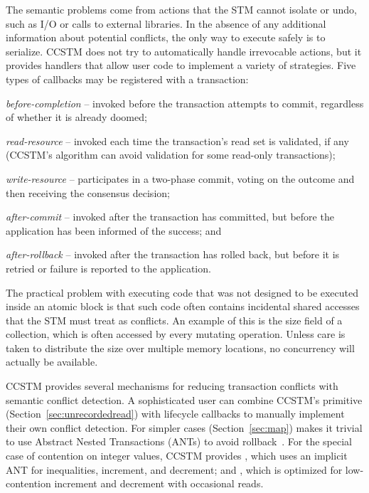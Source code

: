 The semantic problems come
from actions that the STM cannot isolate or undo, such as I/O or calls to
external libraries.  In the absence of any additional information about
potential conflicts, the only way to execute safely is to serialize.
CCSTM does not try to automatically handle irrevocable actions, but
it provides handlers that allow user code to implement a variety of
strategies.  Five types of callbacks may be registered with a transaction:
\begin{packed_itemize}

\item{\it before-completion} -- invoked before the transaction attempts to
commit, regardless of whether it is already doomed;

\item{\it read-resource} -- invoked each time the transaction's read
set is validated, if any (CCSTM's algorithm can avoid validation for
some read-only transactions);

\item{\it write-resource} -- participates in a two-phase commit, voting on the
outcome and then receiving the consensus decision;

\item{\it after-commit} -- invoked after the transaction has committed, but
before the application has been informed of the success; and

\item{\it after-rollback} -- invoked after the transaction has rolled back, but
before it is retried or failure is reported to the application.

\end{packed_itemize}

The practical problem with executing code that was not designed to
be executed inside an atomic block is that such code often contains
incidental shared accesses that the STM must treat as conflicts.
An example of this is the size field of a collection, which is often
accessed by every mutating operation.  Unless care is taken to distribute
the size over multiple memory locations, no concurrency will actually
be available.

CCSTM provides several mechanisms for reducing transaction conflicts with
semantic conflict detection.  A sophisticated user can combine CCSTM's
 primitive (Section~\ref{sec:unrecordedread}) with
lifecycle callbacks to manually implement their own conflict detection.
For simpler cases  (Section~\ref{sec:map})
makes it trivial to use Abstract Nested Transactions (ANTs) to avoid
rollback~\cite{harris07abstract}.  For the special case of contention
on integer values, CCSTM provides , which
uses an implicit ANT for inequalities, increment, and decrement; and
, which is optimized for low-contention increment
and decrement with occasional reads.
